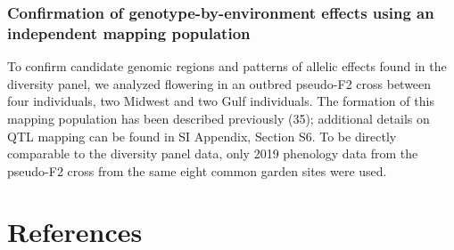 \documentclass[
  9pt,
  twocolumn,
  twoside]{pnas-new}
\begin{document}
\subsubsection{Confirmation of genotype-by-environment effects using an
independent mapping
population}\label{confirmation-of-genotype-by-environment-effects-using-an-independent-mapping-population}

To confirm candidate genomic regions and patterns of allelic effects
found in the diversity panel, we analyzed flowering in an outbred
pseudo-F2 cross between four individuals, two Midwest and two Gulf
individuals. The formation of this mapping population has been described
previously (35); additional details on QTL mapping can be found in SI
Appendix, Section S6. To be directly comparable to the diversity panel
data, only 2019 phenology data from the pseudo-F2 cross from the same
eight common garden sites were used.

\section{References}\label{references}

\bibsplit[2]
\end{document}

